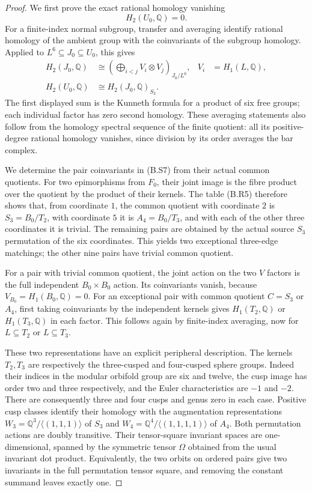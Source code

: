 \begin{proof}
We first prove the exact rational homology vanishing
\[
                         H_2(U_0,\mathbb Q)=0.                 \tag{B.S6}
\]
For a finite-index normal subgroup, transfer and averaging
identify rational homology of the ambient group with the
coinvariants of the subgroup homology.  Applied to
$L^6\subseteq J_0\subseteq U_0$, this gives
\[
\begin{aligned}
 H_2(J_0,\mathbb Q)
   &\cong\left(
        \bigoplus_{i<j}V_i\otimes V_j\right)_{J_0/L^6},
       & V_i&=H_1(L,\mathbb Q),\\
 H_2(U_0,\mathbb Q)&\cong H_2(J_0,\mathbb Q)_{S_3}.
\end{aligned}                                                   \tag{B.S7}
\]
The first displayed sum is the Kunneth formula for a
product of six free groups; each individual factor has
zero second homology.  These averaging statements also
follow from the homology spectral sequence of the finite
quotient: all its positive-degree rational homology
vanishes, since division by its order averages the bar
complex.

We determine the pair coinvariants in (B.S7) from their
actual common quotients.  For two epimorphisms from $F_0$,
their joint image is the fibre product over the quotient
by the product of their kernels.  The table (B.R5)
therefore shows that, from coordinate $1$, the common
quotient with coordinate $2$ is $S_3=B_0/T_2$, with
coordinate $5$ it is $A_4=B_0/T_3$, and with each of the
other three coordinates it is trivial.  The remaining
pairs are obtained by the actual source $S_3$ permutation
of the six coordinates.  This yields two exceptional
three-edge matchings; the other nine pairs have trivial
common quotient.

For a pair with trivial common quotient, the joint action
on the two $V$ factors is the full independent
$B_0\times B_0$ action.  Its coinvariants vanish, because
$V_{B_0}=H_1(B_0,\mathbb Q)=0$.  For an exceptional
pair with common quotient $C=S_3$ or $A_4$, first taking
coinvariants by the independent kernels gives
$H_1(T_2,\mathbb Q)$ or $H_1(T_3,\mathbb Q)$ in each
factor.  This follows again by finite-index averaging,
now for $L\subseteq T_2$ or $L\subseteq T_3$.

These two representations have an explicit peripheral
description.  The kernels $T_2,T_3$ are respectively the
three-cusped and four-cusped sphere groups.  Indeed their
indices in the modular orbifold group are six and twelve,
the cusp image has order two and three respectively,
and the Euler characteristics are $-1$ and $-2$.
There are consequently three and four cusps and genus
zero in each case.  Positive cusp classes identify their
homology with the augmentation representations
$W_3=\mathbb Q^3/\langle(1,1,1)\rangle$ of $S_3$ and
$W_4=\mathbb Q^4/\langle(1,1,1,1)\rangle$ of $A_4$.
Both permutation actions are doubly transitive.  Their
tensor-square invariant spaces are one-dimensional,
spanned by the symmetric tensor $\Omega$ obtained from
the usual invariant dot product.  Equivalently, the two
orbits on ordered pairs give two invariants in the full
permutation tensor square, and removing the constant
summand leaves exactly one.


\end{proof}
